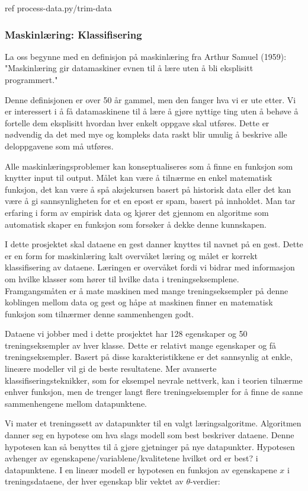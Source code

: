 {\color{red} ref process-data.py/trim-data}

\subsubsection{Maskinlæring: Klassifisering}
La oss begynne med en definisjon på maskinlæring fra Arthur Samuel (1959): "Maskinlæring gir datamaskiner evnen til å lære uten å bli eksplisitt programmert."

Denne definisjonen er over 50 år gammel, men den fanger hva vi er ute etter. Vi er interessert i å få datamaskinene til å lære å gjøre nyttige ting uten å behøve å fortelle dem eksplisitt hvordan hver enkelt oppgave skal utføres. Dette er nødvendig da det med mye og kompleks data raskt blir umulig å beskrive alle deloppgavene som må utføres.

Alle maskinlæringsproblemer kan konseptualiseres som å finne en funksjon som knytter input til output. Målet kan være å tilnærme en enkel matematisk funksjon, det kan være å spå aksjekursen basert på historisk data eller det kan være å gi sannsynligheten for et en epost er spam, basert på innholdet. Man tar erfaring i form av empirisk data og kjører det gjennom en algoritme som automatisk skaper en funksjon som forsøker å dekke denne kunnskapen.

I dette prosjektet skal dataene en gest danner knyttes til navnet på en gest. Dette er en form for maskinlæring kalt overvåket læring og målet er korrekt klassifisering av dataene. Læringen er overvåket fordi vi bidrar med informasjon om hvilke klasser som hører til hvilke data i treningseksemplene. Framgangsmåten er å mate maskinen med mange treningseksempler på denne koblingen mellom data og gest og håpe at maskinen finner en matematisk funksjon som tilnærmer denne sammenhengen godt.

Dataene vi jobber med i dette prosjektet har 128 egenskaper og 50 treningseksempler av hver klasse. Dette er relativt mange egenskaper og få treningseksempler. Basert på disse karakteristikkene er det sannsynlig at enkle, lineære modeller vil gi de beste resultatene. Mer avanserte klassifiseringsteknikker, som for eksempel nevrale nettverk, kan i teorien tilnærme enhver funksjon, men de trenger langt flere treningseksempler for å finne de sanne sammenhengene mellom datapunktene.

Vi mater et treningssett av datapunkter til en valgt læringsalgoritme. Algoritmen danner seg en hypotese om hva slags modell som best beskriver dataene. Denne hypotesen kan så benyttes til å gjøre gjetninger på nye datapunkter. Hypotesen avhenger av egenskapene/variablene/kvalitetene {\color{red} hvilket ord er best?} i datapunktene. I en lineær modell er hypotesen en funksjon av egenskapene $x$ i treningsdataene, der hver egenskap blir vektet av $\theta$-verdier:

